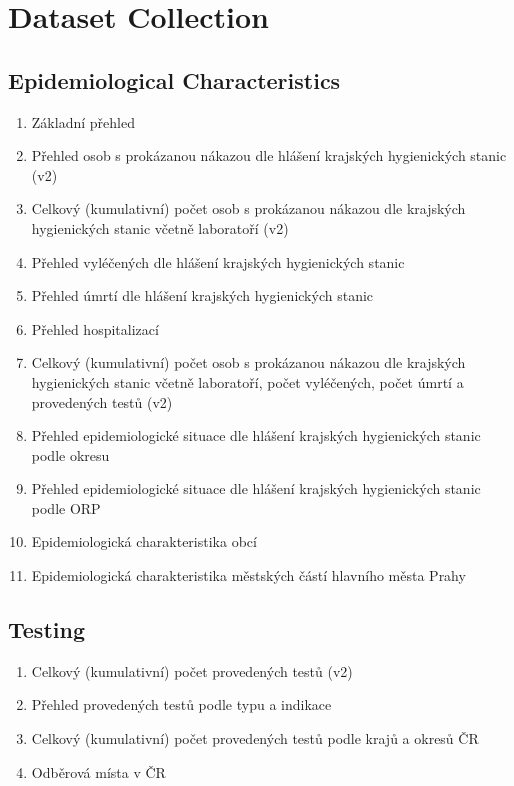 \chapter{Dataset Collection}\label{ch:dataset-collection}

\section{Epidemiological Characteristics}

\begin{enumerate}
    \item Základní přehled
    \item Přehled osob s prokázanou nákazou dle hlášení krajských hygienických stanic (v2)
    \item Celkový (kumulativní) počet osob s prokázanou nákazou dle krajských hygienických stanic včetně laboratoří (v2)
    \item Přehled vyléčených dle hlášení krajských hygienických stanic
    \item Přehled úmrtí dle hlášení krajských hygienických stanic
    \item Přehled hospitalizací
    \item Celkový (kumulativní) počet osob s prokázanou nákazou dle krajských hygienických stanic včetně laboratoří, počet vyléčených, počet úmrtí a provedených testů (v2)
    \item Přehled epidemiologické situace dle hlášení krajských hygienických stanic podle okresu
    \item Přehled epidemiologické situace dle hlášení krajských hygienických stanic podle ORP
    \item Epidemiologická charakteristika obcí
    \item Epidemiologická charakteristika městských částí hlavního města Prahy
\end{enumerate}

\section{Testing}

\begin{enumerate}
    \item Celkový (kumulativní) počet provedených testů (v2)
    \item Přehled provedených testů podle typu a indikace
    \item Celkový (kumulativní) počet provedených testů podle krajů a okresů ČR
    \item Odběrová místa v ČR
\end{enumerate}

